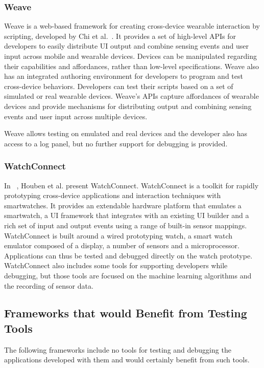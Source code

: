 \subsubsection{Weave}

Weave is a web-based framework for creating cross-device wearable interaction by scripting, developed by Chi et al.~\cite{weave2015}. It provides a set of high-level APIs for developers to easily distribute UI output and combine sensing events and user input across mobile and wearable devices. Devices can be manipulated regarding their capabilities and affordances, rather than low-level specifications. Weave also has an integrated authoring environment for developers to program and test cross-device behaviors. Developers can test their scripts based on a set of simulated or real wearable devices. Weave's APIs capture affordances of wearable devices and provide mechanisms for distributing output and combining sensing events and user input across multiple devices.

Weave allows testing on emulated and real devices and the developer also has access to a log panel, but no further support for debugging is provided. 

\subsubsection{WatchConnect}

In ~\cite{watchconnect2015}, Houben et al. present WatchConnect. WatchConnect is a toolkit for rapidly prototyping cross-device applications and interaction techniques with smartwatches. It provides an extendable hardware platform that emulates a smartwatch, a UI framework that integrates with an existing UI builder and a rich set of input and output events using a range of built-in sensor mappings. WatchConnect is built around a wired prototyping watch, a smart watch emulator composed of a display, a number of sensors and a microprocessor. Applications can thus be tested and debugged directly on the watch prototype. WatchConnect also includes some tools for supporting developers while debugging, but those tools are focused on the machine learning algorithms and the recording of sensor data.

\subsection{Frameworks that would Benefit from Testing Tools}

The following frameworks include no tools for testing and debugging the applications developed with them and would certainly benefit from such tools.

